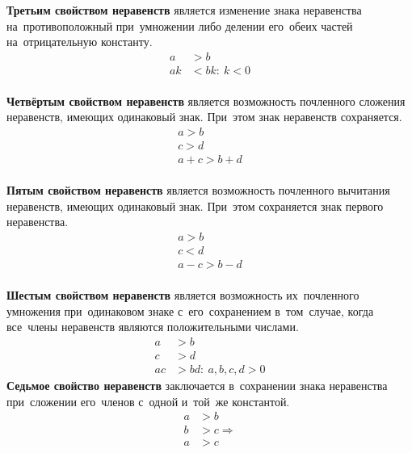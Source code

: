 \documentclass[]{scrartcl}
\begin{document}
\textbf{Третьим свойством неравенств} является изменение знака неравенства на~противоположный при~умножении либо делении его~обеих частей на~отрицательную константу.
\begin{equation}\label{eq:enequalities-property3}
\begin{aligned}
a&>b \\
ak&<bk:\ k<0\\
\end{aligned}
\end{equation}

\textbf{Четвёртым свойством неравенств} является возможность почленного сложения неравенств, имеющих одинаковый знак. При~этом знак неравенств сохраняется.
\begin{equation}\label{eq:enequalities-property4}
\begin{aligned}
a>b \\
c>d \\
a+c>b+d\\
\end{aligned}
\end{equation}

\textbf{Пятым свойством неравенств} является возможность почленного вычитания неравенств, имеющих одинаковый знак. При~этом сохраняется знак первого неравенства.
\begin{equation}\label{eq:enequalities-property5}
\begin{aligned}
a>b \\
c<d \\
a-c>b-d\\
\end{aligned}
\end{equation}

\textbf{Шестым свойством неравенств} является возможность их~почленного умножения при~одинаковом знаке с~его~сохранением в~том~случае, когда все~члены неравенств являются положительными числами.
\begin{equation}\label{eq:enequalities-property6}
\begin{aligned}
a&>b \\
c&>d \\
ac&>bd:\ a,b,c,d>0
\end{aligned}
\end{equation}
\textbf{Седьмое свойство неравенств} заключается в~сохранении знака неравенства при~сложении его~членов с~одной и~той~же константой.
\begin{equation}\label{eq:enequalities-property7}
\begin{aligned}
a&>b \\
b&>c \Rightarrow \\
a&>c\\
\end{aligned}
\end{equation}
\end{document}
